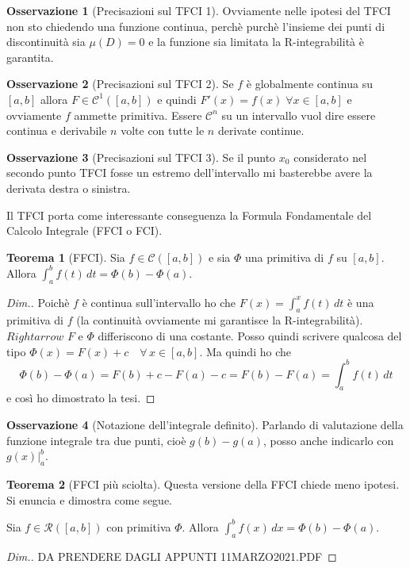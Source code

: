 \documentclass{article}
\theoremstyle{definition}
\newtheorem{theorem}{Teorema}[section]
\theoremstyle{definition}
\theoremstyle{definition}
\theoremstyle{definition}
\newtheorem{remark}{Osservazione}[section]
\theoremstyle{definition}
\begin{document}
\begin{remark}[Precisazioni sul TFCI 1]
    Ovviamente nelle ipotesi del TFCI non sto chiedendo una funzione continua, perchè purchè l'insieme dei punti di discontinuità sia $\mu(D)=0$ e la funzione sia limitata la R-integrabilità è garantita.
\end{remark}

\begin{remark}[Precisazioni sul TFCI 2]
    Se $f$ è globalmente continua su $[a,b]$ allora $F\in\mathcal{C}^1([a,b])$ e quindi $F'(x) = f(x) \; \forall x\in[a,b]$ e ovviamente $f$ ammette primitiva. Essere $\mathcal{C}^n$ su un intervallo vuol dire essere continua e derivabile $n$ volte con tutte le $n$ derivate continue.
\end{remark}

\begin{remark}[Precisazioni sul TFCI 3]
    Se il punto $x_0$ considerato nel secondo punto TFCI fosse un estremo dell'intervallo mi basterebbe avere la derivata destra o sinistra.
\end{remark}

Il TFCI porta come interessante conseguenza la Formula Fondamentale del Calcolo Integrale (FFCI o FCI).

\begin{theorem}[FFCI]
    Sia $f\in\mathcal{C}([a,b])$ e sia $\varPhi$ una primitiva di $f$ su $[a,b]$. Allora $\displaystyle{\int_a^bf(t)\,dt=\varPhi(b)-\varPhi(a)}$.
    \begin{proof}[Dim.]
        Poichè $f$ è continua sull'intervallo ho che $F(x)=\int_a^xf(t)\,dt$ è una primitiva di $f$ (la continuità ovviamente mi garantisce la R-integrabilità).
        $Rightarrow$ $F$ e $\varPhi$ differiscono di una costante. Posso quindi scrivere qualcosa del tipo $\displaystyle{\varPhi(x)=F(x)+c \quad \forall\,x \in [a,b]}$. Ma quindi ho che
        \[
            \varPhi(b)-\varPhi(a) = F(b) + c - F(a) - c = F(b) - F(a) = \int_a^bf(t)\,dt   
        \]
        e così ho dimostrato la tesi.
    \end{proof}
\end{theorem}

\begin{remark}[Notazione dell'integrale definito]
    Parlando di valutazione della funzione integrale tra due punti, cioè $g(b)-g(a)$, posso anche indicarlo con $g(x)\big|_a^b$.
\end{remark}

\begin{theorem}[FFCI più sciolta]
    Questa versione della FFCI chiede meno ipotesi. Si enuncia e dimostra come segue.

    Sia $f\in\mathcal{R}([a,b])$ con primitiva $\varPhi$. Allora $\displaystyle{\int_a^bf(x)\,dx=\varPhi(b)-\varPhi(a)}$.
    \begin{proof}[Dim.]
        DA PRENDERE DAGLI APPUNTI 11MARZO2021.PDF
    \end{proof}
\end{theorem}
\end{document}
